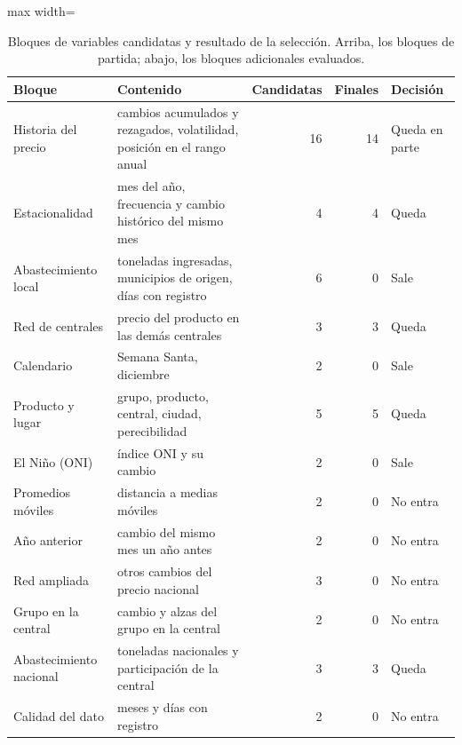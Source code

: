 \begin{table}[htbp]\centering\small
\caption{Bloques de variables candidatas y resultado de la selección. Arriba, los bloques de partida; abajo, los bloques adicionales evaluados.}\label{tab:bloques}
\begin{adjustbox}{max width=\textwidth}\begin{tabular}{l>{\raggedright\arraybackslash}p{5.6cm}rrl}\toprule
Bloque & Contenido & Candidatas & Finales & Decisión\\ \midrule
Historia del precio & cambios acumulados y rezagados, volatilidad, posición en el rango anual & 16 & 14 & Queda en parte \\
Estacionalidad & mes del año, frecuencia y cambio histórico del mismo mes & 4 & 4 & Queda \\
Abastecimiento local & toneladas ingresadas, municipios de origen, días con registro & 6 & 0 & Sale \\
Red de centrales & precio del producto en las demás centrales & 3 & 3 & Queda \\
Calendario & Semana Santa, diciembre & 2 & 0 & Sale \\
Producto y lugar & grupo, producto, central, ciudad, perecibilidad & 5 & 5 & Queda \\
El Niño (ONI) & índice ONI y su cambio & 2 & 0 & Sale \\
\midrule
Promedios móviles & distancia a medias móviles & 2 & 0 & No entra \\
Año anterior & cambio del mismo mes un año antes & 2 & 0 & No entra \\
Red ampliada & otros cambios del precio nacional & 3 & 0 & No entra \\
Grupo en la central & cambio y alzas del grupo en la central & 2 & 0 & No entra \\
Abastecimiento nacional & toneladas nacionales y participación de la central & 3 & 3 & Queda \\
Calidad del dato & meses y días con registro & 2 & 0 & No entra \\
\bottomrule\end{tabular}\end{adjustbox}\end{table}

